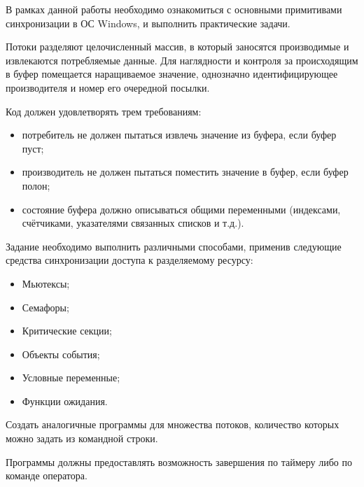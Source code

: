 \documentclass[a4paper, 12pt]{article}		%
\begin{document}
В рамках данной работы необходимо ознакомиться с основными примитивами синхронизации в ОС Windows, и выполнить практические задачи.
\vspace{2em}

Потоки разделяют целочисленный массив, в который заносятся производимые и извлекаются потребляемые данные. Для наглядности и контроля за происходящим в буфер помещается наращиваемое значение, однозначно идентифицирующее производителя и номер его очередной посылки\cite{Dushutina}.
\vspace{1em}

Код должен удовлетворять трем требованиям:
\begin{itemize}
\item потребитель не должен пытаться извлечь значение из буфера, если буфер пуст;
\item производитель не должен пытаться поместить значение в буфер, если буфер полон;
\item состояние буфера должно описываться общими переменными (индексами, счётчиками, указателями связанных списков и т.д.).
\end{itemize}
\vspace{1em}

Задание необходимо выполнить различными способами, применив следующие средства синхронизации доступа к разделяемому ресурсу:
\begin{itemize}
\item Мьютексы;
\item Семафоры;
\item Критические секции;
\item Объекты события;
\item Условные переменные;
\item Функции ожидания.
\end{itemize}

Создать аналогичные программы для множества потоков, количество которых можно задать из командной строки.

Программы должны предоставлять возможность завершения по таймеру либо по команде оператора.
\vspace{3em}
\end{document}

